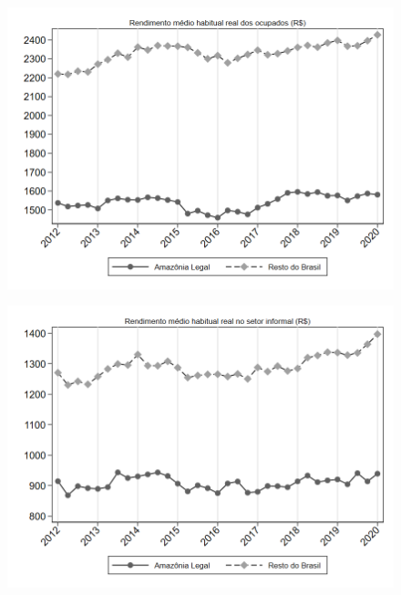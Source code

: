 \begin{frame}[label=_estrutura_renda_rendimento_medio_total]{}
\textit{\hyperlink{_estrutura_renda}{}}
\begin{figure}
  \centering
  \includegraphics[width=1\linewidth]{../../analysis/output/estrutura_renda/_estrutura_renda_rendimento_medio_total.png}
  \caption{}
  \label{fig:_estrutura_renda_rendimento_medio_total}
\end{figure}
\end{frame}

\begin{frame}[label=_estrutura_renda_rendimento_medio_informal]{}
\textit{\hyperlink{_estrutura_renda}{}}
\begin{figure}
  \centering
  \includegraphics[width=1.0\linewidth]{../../analysis/output/estrutura_renda/_estrutura_renda_rendimento_medio_informal.png}
  \caption{}
  \label{fig:_estrutura_renda_rendimento_medio_informal}
\end{figure}
\end{frame}

